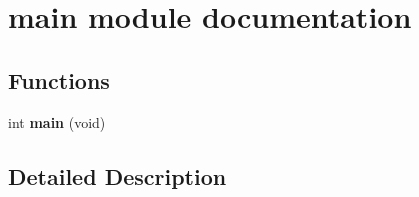 \hypertarget{group__main__module}{}\section{main module documentation}
\label{group__main__module}
\subsection*{Functions}
\begin{DoxyCompactItemize}
\item 
\hypertarget{group__main__module_ga840291bc02cba5474a4cb46a9b9566fe}{}int {\bfseries main} (void)\label{group__main__module_ga840291bc02cba5474a4cb46a9b9566fe}

\end{DoxyCompactItemize}


\subsection{Detailed Description}
